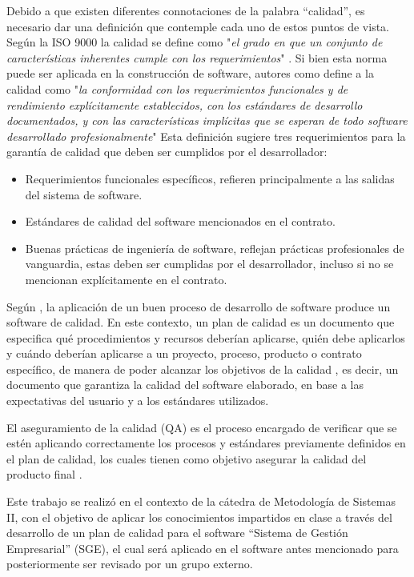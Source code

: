 \documentclass[a4paper,10pt]{article}
\begin{document}
	Debido a que existen diferentes connotaciones de la palabra “calidad”, es necesario dar una definición que contemple cada uno de estos puntos de vista. Según la ISO 9000 la calidad se define como "\textit{el grado en que un conjunto de características inherentes cumple con los requerimientos}" \parencite{ISO_9001_2015}. Si bien esta norma puede ser aplicada en la construcción de software, autores como \parencite{Pressman_2010} define a la calidad como "\textit{la conformidad con los requerimientos funcionales y de rendimiento explícitamente establecidos, con los estándares de desarrollo documentados, y con las características implícitas que se esperan de todo software desarrollado profesionalmente}" \newline Esta definición sugiere tres requerimientos para la garantía de calidad que deben ser cumplidos por el desarrollador:
	
	\begin{itemize}
		\item Requerimientos funcionales específicos, refieren principalmente a las salidas del sistema de software.
		\item Estándares de calidad del software mencionados en el contrato.
		\item Buenas prácticas de ingeniería de software, reflejan prácticas profesionales de vanguardia, estas deben ser cumplidas por el desarrollador, incluso si no se mencionan explícitamente en el contrato.
	\end{itemize}
	
	Según \parencite{Deming_2018}, la aplicación de un buen proceso de desarrollo de software produce un software de calidad. En este contexto, un plan de calidad es un documento que especifica qué procedimientos y recursos deberían aplicarse, quién debe aplicarlos y cuándo deberían aplicarse a un proyecto, proceso, producto o contrato específico, de manera de poder alcanzar los objetivos de la calidad \parencite{Álvarez_López_2005}, es decir, un documento que garantiza la calidad del software elaborado, en base a las expectativas del usuario y a los estándares utilizados.
	
	El aseguramiento de la calidad (QA) es el proceso encargado de verificar que se estén aplicando correctamente los procesos y estándares previamente definidos en el plan de calidad, los cuales tienen como objetivo asegurar la calidad del producto final \parencite{Sommerville_2011}.
	
	Este trabajo se realizó en el contexto de la cátedra de Metodología de Sistemas II, con el objetivo de aplicar los conocimientos impartidos en clase a través del desarrollo de un plan de calidad para el software “Sistema de Gestión Empresarial” (SGE), el cual será aplicado en el software antes mencionado para posteriormente ser revisado por un grupo externo.
	
\end{document}
